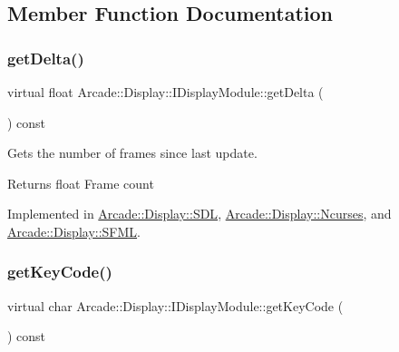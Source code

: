 \subsection{Member Function Documentation}
\mbox{\label{classArcade_1_1Display_1_1IDisplayModule_aab078d82e6fdd32682553947c20226ac}} 
\subsubsection{\texorpdfstring{getDelta()}{getDelta()}}
{\footnotesize\ttfamily virtual float Arcade\+::\+Display\+::\+I\+Display\+Module\+::get\+Delta (\begin{DoxyParamCaption}{ }\end{DoxyParamCaption}) const\hspace{0.3cm}{\ttfamily [pure virtual]}}



Gets the number of frames since last update. 

\begin{DoxyReturn}{Returns}
float Frame count 
\end{DoxyReturn}


Implemented in \mbox{\hyperlink{classArcade_1_1Display_1_1SDL_a1ca09d130dea3bec2481eb72a49c0f03}{Arcade\+::\+Display\+::\+S\+DL}}, \mbox{\hyperlink{classArcade_1_1Display_1_1Ncurses_a16855687c9b3545739f2b65f0d72e86a}{Arcade\+::\+Display\+::\+Ncurses}}, and \mbox{\hyperlink{classArcade_1_1Display_1_1SFML_ae1466db8c13b08e99ebe5ffab68884c7}{Arcade\+::\+Display\+::\+S\+F\+ML}}.

\mbox{\label{classArcade_1_1Display_1_1IDisplayModule_a403f8a0f065dad707a881ef3cee79805}} 
\subsubsection{\texorpdfstring{getKeyCode()}{getKeyCode()}}
{\footnotesize\ttfamily virtual char Arcade\+::\+Display\+::\+I\+Display\+Module\+::get\+Key\+Code (\begin{DoxyParamCaption}{ }\end{DoxyParamCaption}) const\hspace{0.3cm}{\ttfamily [pure virtual]}}



